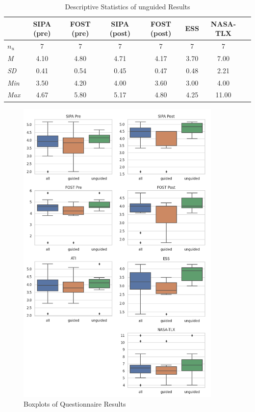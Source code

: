 \documentclass[11pt,a4paper,english]{scrreprt}
\begin{document}
\begin{table}[htbp]
    \centering
    \begin{tabularx}{\textwidth}{ l c c c c c c c }
        \toprule
        & SIPA (pre) & FOST (pre) & SIPA (post) & FOST (post) & ESS & NASA-TLX \\
        \midrule
        \textit{$n_u$} & 7 & 7 & 7 & 7 & 7 & 7 \\
        \textit{M} & 4.10 & 4.80 & 4.71 & 4.17 & 3.70 & 7.00 \\
        \textit{SD} & 0.41 & 0.54 & 0.45 & 0.47 & 0.48 & 2.21 \\
        \textit{Min} & 3.50 & 4.20 & 4.00 & 3.60 & 3.00 & 4.00 \\
        \textit{Max} & 4.67 & 5.80 & 5.17 & 4.80 & 4.25 & 11.00 \\
        \bottomrule
    \end{tabularx}
    \caption{Descriptive Statistics of unguided Results}
    \label{table:evaluation_descriptive_unguided}
\end{table}

\begin{figure}[htbp]
    \centering
    \includegraphics[width=0.9\textwidth]{img/figures/boxplots.png}
    \caption{Boxplots of Questionnaire Results}
    \label{fig:evaluation_descriptive_boxplots}
\end{figure}
\end{document}
